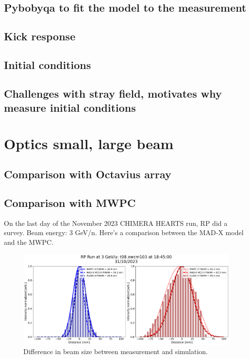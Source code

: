 \documentclass[a4paper,
               ]{jacow}
\begin{document}
\subsection{Pybobyqa to fit the model to the measurement}
\subsection{Kick response}
\subsection{Initial conditions}
\subsection{Challenges with stray field, motivates why measure initial conditions}

\section{Optics small, large beam}
\subsection{Comparison with Octavius array}
\subsection{Comparison with MWPC}

On the last day of the November 2023 CHIMERA HEARTS run, RP did a survey.
Beam energy: 3 GeV/n. Here's a comparison between the MAD-X model and the MWPC.

\begin{figure}[!htb]
   \centering
   \includegraphics*[width=1.0\columnwidth]{rp_survey.png}
   \caption{Difference in beam size between measurement and simulation.}
   \label{fig:diff_beam_size}
\end{figure}
\end{document}
